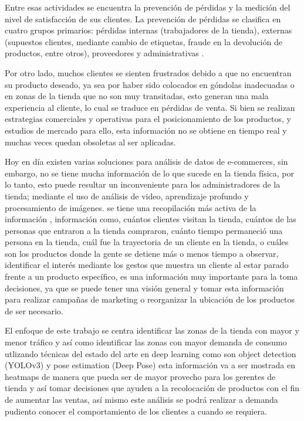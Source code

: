 \documentclass[conference]{IEEEtran}
\begin{document}
Entre esas actividades se encuentra la prevención de pérdidas y la medición del nivel de satisfacción de sus clientes. La prevención de pérdidas se clasifica en cuatro grupos primarios: pérdidas internas (trabajadores de la tienda), externas (supuestos clientes, mediante cambio de etiquetas, fraude en la devolución de productos, entre otros), proveedores y administrativas \cite{deyle2015global}.

Por otro lado, muchos clientes se sienten frustrados debido a que no encuentran su producto deseado, ya sea por haber sido colocados en góndolas inadecuadas o en zonas de la tienda que no son muy transitadas, esto generan una mala experiencia al cliente, lo cual se traduce en pérdidas de venta. Si bien se realizan estrategias comerciales y operativas para el posicionamiento de los productos, y estudios de mercado para ello, esta información no se obtiene en tiempo real y muchas veces quedan obsoletas al ser aplicadas.

Hoy en día existen varias soluciones para análisis de datos de e-commerces, sin embargo, no se tiene mucha información de lo que sucede en la tienda física, por lo tanto, esto puede resultar un inconveniente para los administradores de la tienda; mediante el uso de análisis de video, aprendizaje profundo y procesamiento de imágenes. se tiene una recopilación más activa de la información \cite{karim2018customer}, información como, cuántos clientes visitan la tienda, cuántos de las personas que entraron a la tienda compraron, cuánto tiempo permaneció una persona en la tienda, cuál fue la trayectoria de un cliente en la tienda, o cuáles son los productos donde la gente se detiene más o menos tiempo a observar, identificar el interés mediante los gestos que muestra un cliente al estar parado frente a un producto específico, es una información muy importante para la toma decisiones, ya que  se puede tener una visión general y tomar esta información para realizar campañas de marketing o reorganizar la ubicación de los productos de ser necesario.

El enfoque de este trabajo se centra identificar las zonas de la tienda con mayor y menor tráfico y así como identificar las zonas con mayor demanda de consumo utlizando técnicas del estado del arte en deep learning como son object detection (YOLOv3) y pose estimation (Deep Pose) esta información va a ser mostrada en heatmaps de manera que pueda ser de mayor provecho para los gerentes de tienda y así tomar decisiones que ayuden a la recolocación de productos con el fin de aumentar las ventas, así mismo este análisis se podrá realizar a demanda pudiento conocer el comportamiento de los clientes a cuando se requiera.
\end{document}
